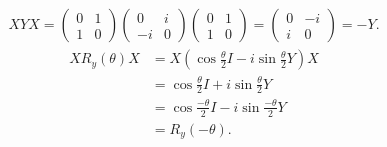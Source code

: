 \begin{align}
    XYX=\begin{pmatrix}
    0&1\\1&0
    \end{pmatrix}
    \begin{pmatrix}
    0&i\\-i&0
    \end{pmatrix}
    \begin{pmatrix}
    0&1\\1&0
    \end{pmatrix}=\begin{pmatrix}
    0&-i\\i&0
    \end{pmatrix}=-Y.
\end{align}
\begin{align}
    XR_y(\theta)X&=X\left(\cos\frac{\theta}{2}I-i\sin\frac{\theta}{2}Y\right)X\\
    &=\cos\frac{\theta}{2}I+i\sin\frac{\theta}{2}Y\\
    &=\cos\frac{-\theta}{2}I-i\sin\frac{-\theta}{2}Y\\
    &=R_y(-\theta).
\end{align}


